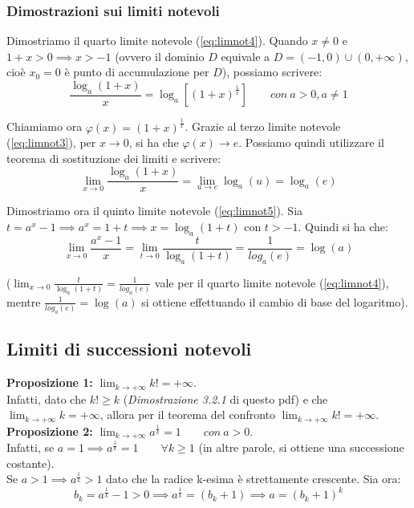 \documentclass{article}
\begin{document}
\subsubsection{Dimostrazioni sui limiti notevoli}
\noindent Dimostriamo il quarto limite notevole (\ref{eq:limnot4}). Quando $x \neq 0$ e $1 + x > 0 \implies x > -1$ (ovvero il dominio $D$ equivale a $D = (-1, 0) \cup (0, +\infty)$, cioè $x_0 = 0$ è punto di accumulazione per $D$), possiamo scrivere:
\begin{equation*}
    \frac{\log_a(1 +x)}{x} = \log_a[(1 + x)^\frac{1}{x}] \qquad con \ a > 0, a \neq 1
\end{equation*}

\noindent Chiamiamo ora $\varphi(x) = (1 + x)^\frac{1}{x}$. Grazie al terzo limite notevole (\ref{eq:limnot3}), per $x \to 0$, si ha che $\varphi(x) \to e$. Possiamo quindi utilizzare il teorema di sostituzione dei limiti e scrivere:
\begin{equation*}
    \lim_{x \to 0} \frac{\log_a(1 + x)}{x} = \lim_{u \to e} \log_a(u) = \log_a(e)
\end{equation*}

\noindent Dimostriamo ora il quinto limite notevole (\ref{eq:limnot5}). Sia $t = a^x - 1 \implies a^x = 1 + t \implies x = \log_a(1 + t)$ con $t > -1$. Quindi si ha che:
\begin{equation*}
    \lim_{x \to 0} \frac{a^x - 1}{x} = \lim_{t \to 0} \frac{t}{\log_a(1 + t)} = \frac{1}{log_a(e)} = \log(a)
\end{equation*}

\noindent ($\lim_{x \to 0} \frac{t}{\log_a(1 + t)} = \frac{1}{log_a(e)}$ vale per il quarto limite notevole (\ref{eq:limnot4}), mentre $\frac{1}{log_a(e)} = \log(a)$ si ottiene effettuando il cambio di base del logaritmo).

\subsection{Limiti di successioni notevoli}
\textbf{Proposizione 1:} $\lim_{k \to +\infty} k! = +\infty$.\\
Infatti, dato che $k! \geq k$ (\textit{Dimostrazione 3.2.1} di questo pdf) e che $\lim_{k \to +\infty} k = +\infty$, allora per il teorema del confronto $\lim_{k \to +\infty} k! = +\infty$.\\

\noindent\textbf{Proposizione 2:} $\lim_{k \to +\infty} a^\frac{1}{k} = 1 \qquad con \ a > 0$.\\
Infatti, se $a = 1 \implies a^\frac{1}{k} = 1 \qquad \forall k \geq 1$ (in altre parole, si ottiene una successione costante).\\
Se $a > 1 \implies a^\frac{1}{k} > 1$ dato che la radice k-esima è strettamente crescente. Sia ora:
\begin{equation*}
    b_k = a^\frac{1}{k} - 1 > 0 \implies a^\frac{1}{k} = (b_k + 1) \implies a = (b_k + 1)^k
\end{equation*}
\end{document}
